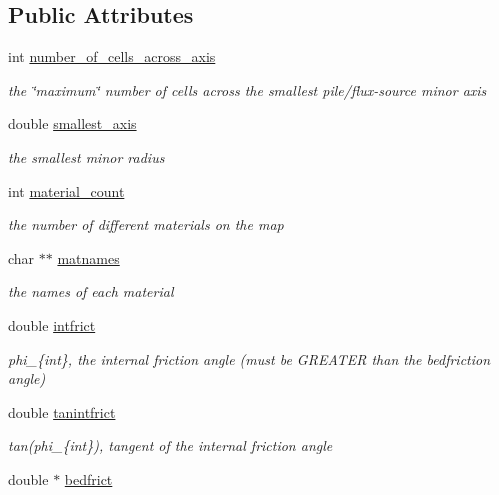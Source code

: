 \subsection*{Public Attributes}
\begin{CompactItemize}
\item 
int \hyperlink{structMatProps_o0}{number\_\-of\_\-cells\_\-across\_\-axis}
\begin{CompactList}\small\item\em the \char`\"{}maximum\char`\"{} number of cells across the smallest pile/flux-source minor axis \item\end{CompactList}\item 
double \hyperlink{structMatProps_o1}{smallest\_\-axis}
\begin{CompactList}\small\item\em the smallest minor radius \item\end{CompactList}\item 
int \hyperlink{structMatProps_o2}{material\_\-count}
\begin{CompactList}\small\item\em the number of different materials on the map \item\end{CompactList}\item 
char $\ast$$\ast$ \hyperlink{structMatProps_o3}{matnames}
\begin{CompactList}\small\item\em the names of each material \item\end{CompactList}\item 
double \hyperlink{structMatProps_o4}{intfrict}
\begin{CompactList}\small\item\em phi\_\-\{int\}, the internal friction angle (must be GREATER than the bedfriction angle) \item\end{CompactList}\item 
double \hyperlink{structMatProps_o5}{tanintfrict}
\begin{CompactList}\small\item\em tan(phi\_\-\{int\}), tangent of the internal friction angle \item\end{CompactList}\item 
double $\ast$ \hyperlink{structMatProps_o6}{bedfrict}
$$
\end{CompactItemize}
